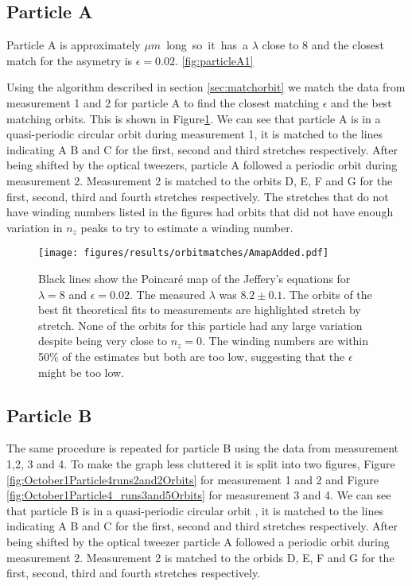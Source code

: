 \subsection{Particle A}
Particle A is approximately \unit[24]{$\mu m$} long so it has a $\lambda$ close to 8 and the closest match for the asymetry is $\epsilon = 0.02$. \ref{fig:particleA1}


Using the algorithm described in section \ref{sec:matchorbit} we match the data from measurement 1 and 2 for particle A to find the closest matching $\epsilon$ and the best matching orbits. This is shown in Figure\ref{fig:particleAOrbitFit}. We can see that particle A is in a quasi-periodic circular orbit during measurement 1, it is matched to the lines indicating A B and C for the first, second and third stretches respectively.  After being shifted by the optical tweezers, particle A followed a periodic orbit during measurement 2. Measurement 2 is matched to the orbits D, E, F and G for the first, second, third and fourth stretches respectively. The stretches that do not have winding numbers listed in the figures had orbits that did not have enough variation in $n_z$ peaks to try to estimate a winding number. 

\begin{figure}[H]
\begin{center}
\texttt{[image: figures/results/orbitmatches/AmapAdded.pdf]}
\end{center}
\caption{Black lines show the Poincaré map of the Jeffery's equations for $\lambda = 8$ and $\epsilon = 0.02$. The measured $\lambda$ was $8.2 \pm 0.1$. The orbits of the best fit theoretical fits to measurements are highlighted stretch by stretch. None of the orbits for this particle had any large variation despite being very close to $n_z=0$. The winding numbers are within 50\% of the estimates but both are too low, suggesting that the $\epsilon$ might be too low.}
\label{fig:particleAOrbitFit}
\end{figure}

\subsection{Particle B}

The same procedure is repeated for particle B using the data from measurement 1,2, 3 and 4. To make the graph less cluttered it is split into two figures, Figure \ref{fig:October1Particle4runs2and2Orbits} for measurement 1 and 2 and Figure \ref{fig:October1Particle4_runs3and5Orbits} for measurement 3 and 4. We can see that particle B is in a quasi-periodic circular orbit , it is matched to the lines indicating A B and C for the first, second and third stretches respectively.  After being shifted by  the optical tweezer particle A followed a periodic orbit during measurement 2. Measurement 2 is matched to the orbids D, E, F and G for the first, second, third and fourth stretches respectively. 

